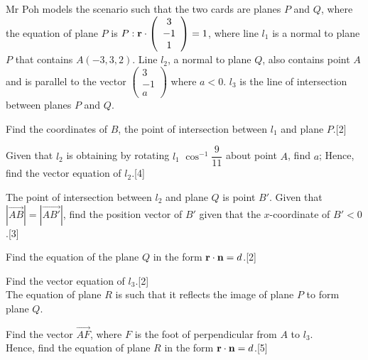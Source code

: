 \documentclass[12pt, a4 paper]{article}
\begin{document}
\begin{outline}[enumerate]
	Mr Poh models the scenario such that the two cards are planes $P$ and $Q$, where the equation of plane $P$ is $P:{\bf{r}} \cdot \left( {\begin{array}{*{20}{c}}3\\{ - 1}\\1\end{array}} \right) = 1$, where line ${l_1}$ is a normal to plane $P$ that contains $A( - 3,3,2)$. Line ${l_2}$, a normal to plane $Q$, also contains point $A$ and is parallel to the vector $\left( {\begin{array}{*{20}{c}}3\\{ - 1}\\a\end{array}} \right)$ where $a < 0$. ${l_3}$ is the line of intersection between planes $P$ and $Q$.
		
	\2 Find the coordinates of $B$, the point of intersection between ${l_1}$ and plane $P$.\hfill[2]
	
	\2 Given that ${l_2}$ is obtaining by rotating ${l_1}$ ${\cos ^{ - 1}}\dfrac{9}{{11}}$ about point $A$, find $a$; Hence, find the vector equation of ${l_2}$.\hfill[4]
		 
	\2 	The point of intersection between ${l_2}$ and plane $Q$ is point $B'$. Given that $\left| {\overrightarrow {AB} } \right| = \left| {\overrightarrow {AB'} } \right|$, find the position vector of $B'$ given that the $x$-coordinate of $B' < 0$.\hfill[3]
	
	\2	Find the equation of the plane $Q$ in the form ${\bf{r}} \cdot {\bf{n}} = d$.\hfill[2]
	
	\2	Find the vector equation of ${l_3}$.\hfill[2]\\
					
	The equation of plane $R$ is such that it reflects the image of plane $P$ to form plane $Q$.
		
	\2	Find the vector $\overrightarrow {AF} $, where $F$ is the foot of perpendicular from $A$ to ${l_3}$. \\
	Hence, find the equation of plane $R$ in the form ${\bf{r}} \cdot {\bf{n}} = d$.\hfill[5]
	
\end{outline}
\end{document}
